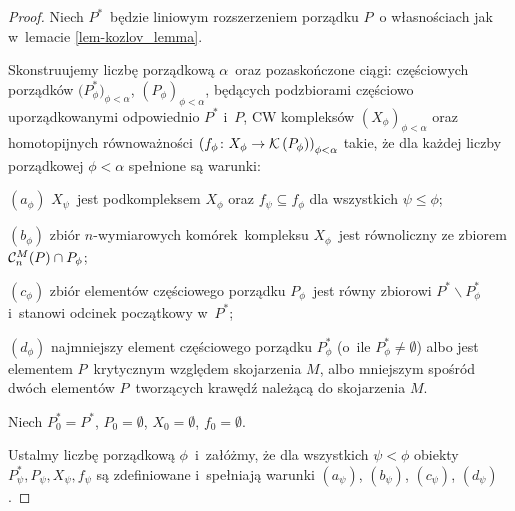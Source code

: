 \begin{proof}
Niech $P^*$~będzie liniowym rozszerzeniem porządku $P$~o własnościach jak w~lemacie \ref{lem-kozlov_lemma}.

Skonstruujemy liczbę porządkową $\alpha$~oraz pozaskończone ciągi: częściowych porządków $\bigl(P^*_\phi\bigr)_{\phi<\alpha}$, $\left(P_\phi\right)_{\phi<\alpha}$, będących podzbiorami częściowo uporządkowanymi odpowiednio $P^*$ i~$P$, CW kompleksów $\left(X_\phi\right)_{\phi<\alpha}$ oraz homotopijnych równoważności $\left(f_\phi\colon X_\phi\to \mathcal{K}\left(P_\phi\right)\right)_{\phi<\alpha}$ takie, że dla każdej liczby porządkowej $\phi<\alpha$ spełnione są warunki:
\begin{compactitem}
\item[$(a_\phi)$] $X_\psi$~jest podkompleksem $X_\phi$ oraz $f_\psi\subseteq f_\phi$ dla wszystkich $\psi\leq\phi$;
\item[$(b_\phi)$] zbiór $n$-wymiarowych komórek~kompleksu $X_\phi$~jest równoliczny ze zbiorem $\mathcal{C}^M_n(P)\cap P_\phi$;
\item[$(c_\phi)$] zbiór elementów częściowego porządku $P_\phi$~jest równy zbiorowi $P^*\smallsetminus P^*_\phi$ i~stanowi odcinek początkowy w~$P^*$;
\item[$(d_\phi)$] najmniejszy element częściowego porządku $P^*_\phi$ (o~ile $P^*_\phi\not=\emptyset$) albo jest elementem $P$~krytycznym względem skojarzenia $M$, albo mniejszym spośród dwóch elementów $P$~tworzących krawędź należącą do skojarzenia $M$.
\end{compactitem}

Niech $P^*_0=P^*$, $P_0=\emptyset$, $X_0=\emptyset$, $f_0=\emptyset$.

Ustalmy liczbę porządkową $\phi$~i~załóżmy, że dla wszystkich $\psi<\phi$ obiekty $P^*_\psi,P_\psi,X_\psi,f_\psi$ są zdefiniowane i~spełniają warunki $(a_\psi)$, $(b_\psi)$, $(c_\psi)$, $(d_\psi)$.


\end{proof}
